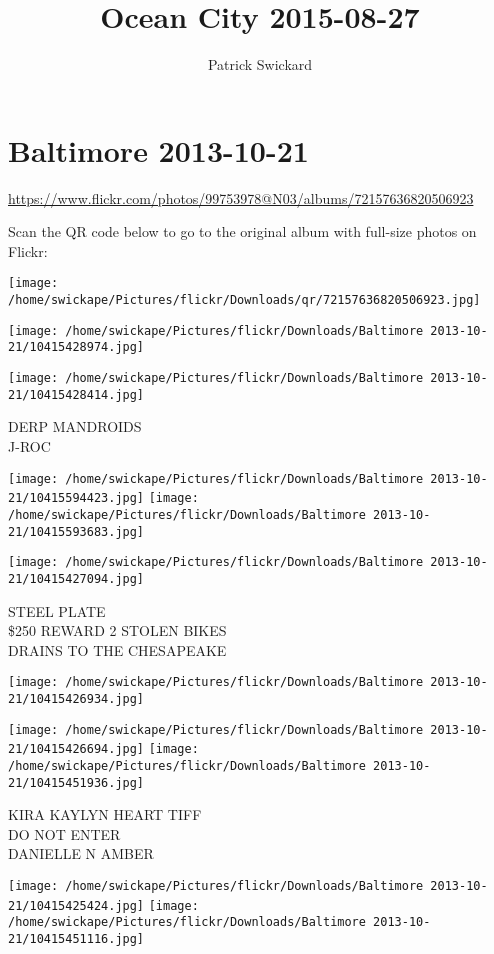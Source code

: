 \documentclass[10pt,letterpaper]{article}
\title{Ocean City 2015-08-27}
\author{Patrick Swickard}
\date{}
\begin{document}
\section*{Baltimore 2013-10-21}

\url{https://www.flickr.com/photos/99753978@N03/albums/72157636820506923}

Scan the QR code below to go to the original album with full-size photos on Flickr:

\texttt{[image: /home/swickape/Pictures/flickr/Downloads/qr/72157636820506923.jpg]}
\pagebreak

\texttt{[image: /home/swickape/Pictures/flickr/Downloads/Baltimore 2013-10-21/10415428974.jpg]}

\vspace{0.25in}
\texttt{[image: /home/swickape/Pictures/flickr/Downloads/Baltimore 2013-10-21/10415428414.jpg]}

DERP MANDROIDS\\
J{-}ROC
\pagebreak

\texttt{[image: /home/swickape/Pictures/flickr/Downloads/Baltimore 2013-10-21/10415594423.jpg]}
\texttt{[image: /home/swickape/Pictures/flickr/Downloads/Baltimore 2013-10-21/10415593683.jpg]}

\vspace{0.25in}
\texttt{[image: /home/swickape/Pictures/flickr/Downloads/Baltimore 2013-10-21/10415427094.jpg]}

STEEL PLATE\\
\$250 REWARD 2 STOLEN BIKES\\
DRAINS TO THE CHESAPEAKE
\pagebreak

\texttt{[image: /home/swickape/Pictures/flickr/Downloads/Baltimore 2013-10-21/10415426934.jpg]}

\vspace{0.25in}
\texttt{[image: /home/swickape/Pictures/flickr/Downloads/Baltimore 2013-10-21/10415426694.jpg]}
\texttt{[image: /home/swickape/Pictures/flickr/Downloads/Baltimore 2013-10-21/10415451936.jpg]}

KIRA KAYLYN HEART TIFF\\
DO NOT ENTER\\
DANIELLE N AMBER
\pagebreak

\texttt{[image: /home/swickape/Pictures/flickr/Downloads/Baltimore 2013-10-21/10415425424.jpg]}
\texttt{[image: /home/swickape/Pictures/flickr/Downloads/Baltimore 2013-10-21/10415451116.jpg]}
\end{document}

